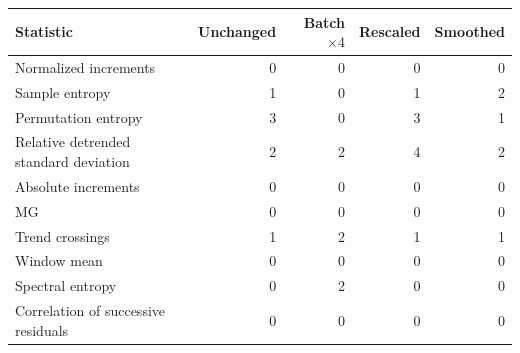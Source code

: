 \begin{tabular}{lrrrr}
\toprule
Statistic & Unchanged & Batch $\times4$ & Rescaled & Smoothed \\
\midrule
Normalized increments & 0 & 0 & 0 & 0 \\
Sample entropy & 1 & 0 & 1 & 2 \\
Permutation entropy & 3 & 0 & 3 & 1 \\
Relative detrended standard deviation & 2 & 2 & 4 & 2 \\
Absolute increments & 0 & 0 & 0 & 0 \\
MG & 0 & 0 & 0 & 0 \\
Trend crossings & 1 & 2 & 1 & 1 \\
Window mean & 0 & 0 & 0 & 0 \\
Spectral entropy & 0 & 2 & 0 & 0 \\
Correlation of successive residuals & 0 & 0 & 0 & 0 \\
\bottomrule
\end{tabular}
